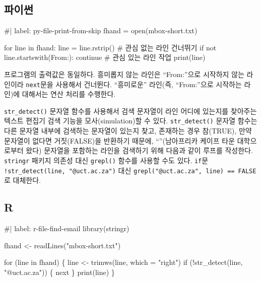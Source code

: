 \documentclass[
  letterpaper,
]{book}
\newenvironment{Shaded}{\begin{snugshade}}{\end{snugshade}}
\newcommand{\NormalTok}[1]{\textcolor[rgb]{0.00,0.23,0.31}{#1}}
\begin{document}
\subsection{파이썬}

\begin{Shaded}
\begin{Highlighting}[]
\NormalTok{\#| label: py{-}file{-}print{-}from{-}skip}
\NormalTok{fhand = open(\textquotesingle{}mbox{-}short.txt\textquotesingle{})}

\NormalTok{for line in fhand:}
\NormalTok{    line = line.rstrip()}
\NormalTok{    \# 관심 없는 라인 건너뛰기}
\NormalTok{    if not line.startswith(\textquotesingle{}From:\textquotesingle{}):}
\NormalTok{        continue}
\NormalTok{    \# 관심 있는 라인 작업}
\NormalTok{    print(line)}
\end{Highlighting}
\end{Shaded}

프로그램의 출력값은 동일하다. 흥미롭지 않는 라인은 ``From:''으로
시작하지 않는 라인이라 \texttt{next}문을 사용해서 건너뛴다. ``흥미로운''
라인(즉, ``From:''으로 시작하는 라인)에 대해서는 연산 처리를 수행한다.

\texttt{str\_detect()} 문자열 함수를 사용해서 검색 문자열이 라인 어디에
있는지를 찾아주는 텍스트 편집기 검색 기능을 모사(simulation)할 수 있다.
\texttt{str\_detect()} 문자열 함수는 다른 문자열 내부에 검색하는
문자열이 있는지 찾고, 존재하는 경우 참(TRUE), 만약 문자열이 없다면
거짓(FALSE)을 반환하기 때문에, ``\textcite{uct.ac.za}''(남아프리카
케이프 타운 대학으로부터 왔다) 문자열을 포함하는 라인을 검색하기 위해
다음과 같이 루프를 작성한다. \texttt{stringr} 패키지 의존성 대신
\texttt{grepl()} 함수를 사용할 수도 있다. \texttt{if}문
\texttt{!str\_detect(line,\ "@uct.ac.za")} 대신
\texttt{grepl("@uct.ac.za",\ line)\ ==\ FALSE}로 대체한다.

\subsection{R}

\begin{Shaded}
\begin{Highlighting}[]
\NormalTok{\#| label: r{-}file{-}find{-}email}
\NormalTok{library(stringr)}

\NormalTok{fhand \textless{}{-} readLines("mbox{-}short.txt")}

\NormalTok{for (line in fhand) \{}
\NormalTok{  line \textless{}{-} trimws(line, which = "right")}
\NormalTok{  if (!str\_detect(line, "@uct.ac.za")) \{}
\NormalTok{    next}
\NormalTok{  \}}
\NormalTok{  print(line)}
\NormalTok{\}}
\end{Highlighting}
\end{Shaded}
\end{document}

